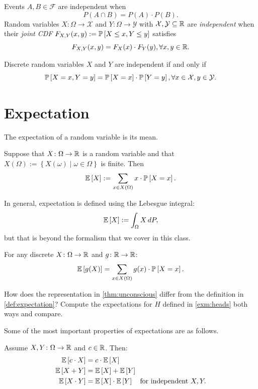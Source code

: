 \documentclass[letterpaper,11pt]{article}
\begin{document}
\begin{defn}[Independent RV]
  Events $A,B \in \mathcal{F}$ are independent when
  \[
   P(A \cap B) = P(A) \cdot P(B).
  \]
  Random variables $X\colon \Omega \to \mathcal{X}$ and $Y\colon \Omega \to \mathcal{Y}$ with $\mathcal{X}, \mathcal{Y} \subseteq \Real$ are \emph{independent} when their \emph{joint CDF} $F_{X, Y}(x,y) := \P{X \le x, Y \le y}$ satisfies
  \[
    F_{X, Y}(x,y) = F_{X}(x) \cdot F_{Y}(y),
    \forall x, y\in \Real.
  \]
\end{defn}
Discrete random variables $X$ and $Y$ are independent if and only if
\[
  \P{X = x, Y = y} = \P{X = x} \cdot \P{Y = y}, \forall x\in \mathcal{X}, y\in \mathcal{Y}.
\]


\section{Expectation}

The expectation of a random variable is its mean.

\begin{defn} \label{def:expectation}
Suppose that $X\colon \Omega \to \Real $ is a random variable and that $X(\Omega) := \left\{ X(\omega) \mid  \omega \in \Omega  \right\}$ is finite. Then
\[ 
 \E{X} := \sum_{x\in X(\Omega)}  x\cdot \P{X = x}.
\]
\end{defn}
In general, expectation is defined using the Lebesgue integral:
\[
 \E{X} := \int_{\Omega} X \, dP,
\]
but that is beyond the formalism that we cover in this class. 
 

\begin{theorem} \label{thm:unconscious}
  For any discrete $X\colon \Omega \to \Real$ and $g\colon \Real \to \Real$:
  \[
    \E{g(X)} = \sum_{x\in X(\Omega)} g(x) \cdot  \P{X = x}.
  \]
\end{theorem}

\begin{question}
How does the representation in \cref{thm:unconscious} differ from the definition in \cref{def:expectation}? Compute the expectations for $H$ defined in \cref{exm:heads} both ways and compare. 
\end{question}

Some of the most important properties of expectations are as follows.
\begin{theorem}
  Assume $X,Y\colon \Omega \to \Real$ and $c\in \Real $. Then:
  \begin{align*}
    \E{c\cdot X} &= c \cdot  \E{X}\\
    \E{X + Y} &= \E{X} + \E{Y}\\
    \E{X \cdot Y} &= \E{X} \cdot \E{Y} \quad \text{for independent } X, Y.
  \end{align*}
\end{theorem}
\end{document}
